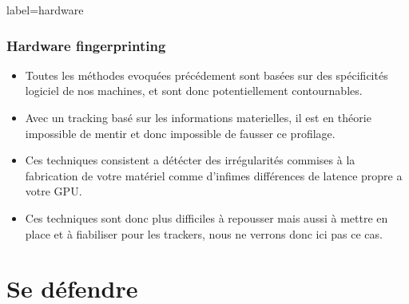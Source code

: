 \documentclass{beamer}
\begin{document}
        \begin{frame}{label=hardware}
            \frametitle{Hardware fingerprinting}
            \begin{center}
                \begin{itemize}
                    \item Toutes les méthodes evoquées précédement sont basées sur des spécificités logiciel de nos machines, et sont donc potentiellement contournables.
                    \item Avec un tracking basé sur les informations materielles, il est en théorie impossible de mentir et donc impossible de fausser ce profilage.
                    \item Ces techniques consistent a détécter des irrégularités commises à la fabrication de votre matériel comme d'infimes différences de latence propre a votre GPU.
                    \item Ces techniques sont donc plus difficiles à repousser mais aussi à mettre en place et à fiabiliser pour les trackers, nous ne verrons donc ici pas ce cas.
                \end{itemize}
            \end{center}
        \end{frame}
    \section{Se défendre}
\end{document}
